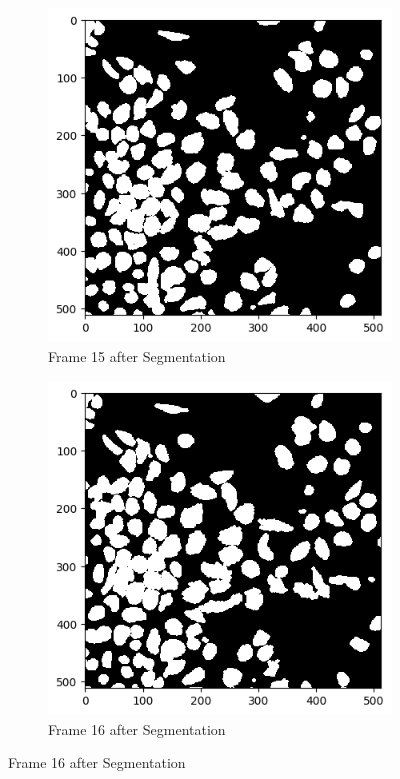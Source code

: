 \documentclass{article}
\begin{document}
\begin{figure}[h!]
  \begin{subfigure}{0.4\textwidth}
    \includegraphics[width=\linewidth]{Report/Appendix_Images/Segmentation-A-Control/frame_15.png}
    \caption*{Frame 15 after Segmentation}
  \end{subfigure}
  \hfill
  \begin{subfigure}{0.4\textwidth}
    \includegraphics[width=\linewidth]{Report/Appendix_Images/Segmentation-A-Control/frame_16.png}
    \caption*{Frame 16 after Segmentation}
  \end{subfigure}


\end{figure}
\end{document}

